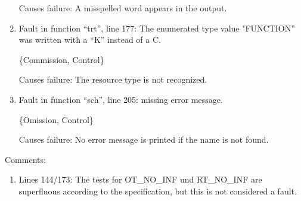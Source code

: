 \begin{enumerate}
Causes failure: A misspelled word appears in the output.


\item Fault in function ``trt'', line 177: The enumerated type value
"FUNCTION'' was written with a ``K'' instead of a C.

\{Commission, Control\}

Causes failure: The resource type is not recognized.

\item Fault in function ``sch'', line 205: missing error message.

\{Omission, Control\}

Causes failure: No error message is printed if the name is not found.

\end{enumerate}

Comments:
\begin{enumerate}
\item Lines 144/173: The tests for  OT\_NO\_INF und RT\_NO\_INF are
superfluous according to the specification, but this is not considered
a fault.
\end{enumerate}
